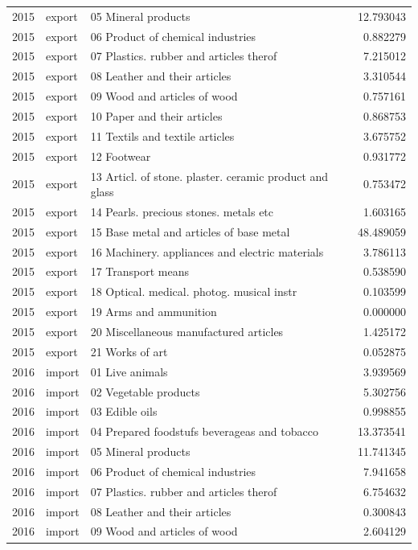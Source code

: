 \begin{tabular}{rllr}
2015 & export & 05 Mineral products & 12.793043 \\
2015 & export & 06 Product of chemical industries & 0.882279 \\
2015 & export & 07 Plastics. rubber and articles therof & 7.215012 \\
2015 & export & 08 Leather and their articles & 3.310544 \\
2015 & export & 09 Wood and articles of wood & 0.757161 \\
2015 & export & 10 Paper and their articles & 0.868753 \\
2015 & export & 11 Textils and textile articles & 3.675752 \\
2015 & export & 12 Footwear & 0.931772 \\
2015 & export & 13 Articl. of stone. plaster. ceramic product and glass & 0.753472 \\
2015 & export & 14 Pearls. precious stones. metals etc & 1.603165 \\
2015 & export & 15 Base metal and articles of base metal & 48.489059 \\
2015 & export & 16 Machinery. appliances and electric materials & 3.786113 \\
2015 & export & 17 Transport means & 0.538590 \\
2015 & export & 18 Optical. medical. photog. musical instr & 0.103599 \\
2015 & export & 19 Arms and ammunition & 0.000000 \\
2015 & export & 20 Miscellaneous manufactured articles & 1.425172 \\
2015 & export & 21 Works of art & 0.052875 \\
2016 & import & 01 Live animals & 3.939569 \\
2016 & import & 02 Vegetable products & 5.302756 \\
2016 & import & 03 Edible oils & 0.998855 \\
2016 & import & 04 Prepared foodstufs beverageas and tobacco & 13.373541 \\
2016 & import & 05 Mineral products & 11.741345 \\
2016 & import & 06 Product of chemical industries & 7.941658 \\
2016 & import & 07 Plastics. rubber and articles therof & 6.754632 \\
2016 & import & 08 Leather and their articles & 0.300843 \\
2016 & import & 09 Wood and articles of wood & 2.604129 \\

\end{tabular}
